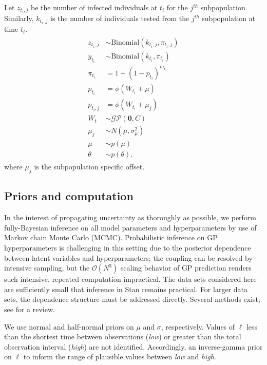 \documentclass{article}
\begin{document}
Let $z_{t_i,j}$ be the number of infected individuals at $t_i$ for the $j^{th}$ subpopulation. Similarly, $k_{t_i, j}$ is the number of individuals tested from the $j^{th}$ subpopulation at time $t_i$. 
\begin{align}
\begin{split} \label{hier}
    z_{t_i,j} & \sim \text{Binomial}(k_{t_i,j}, \pi_{t_i,j})\\
    y_{t_i} &\sim \text{Binomial}(k_{t_i}, \pi_{t_i}) \\
    \pi_{t_i} &= 1 - (1 - p_{t_i})^{m_{t_i}} \\
    p_{t_i} &= \phi(W_{t_i} + \mu) \\
        p_{t_i,j} &= \phi(W_{t_i} + \mu_j) \\
    W_t &\sim \mathcal{GP}(\mathbf{0}, C) \\
     \mu_j &\sim N(\mu, \sigma^2_\mu) \\
     \mu &\sim p(\mu) \\
    \theta &\sim p(\theta).
\end{split}
\end{align}
where $\mu_j$ is the subpopulation specific offset.

\subsection{Priors and computation}

In the interest of propagating uncertainty as thoroughly as possible, we perform fully-Bayesian inference on all model parameters and hyperparameters by use of Markov chain Monte Carlo (MCMC). Probabilistic inference on GP hyperparameters is challenging in this setting due to the posterior dependence between latent variables and hyperparameters; the coupling can be resolved by intensive sampling, but the $\mathcal{O}(N^3)$ scaling behavior of GP prediction renders such intensive, repeated computation impractical. The data sets considered here are sufficiently small that inference in Stan \cite{carpenter2017stan} remains practical. For larger data sets, the dependence structure must be addressed directly. Several methods exist; see \cite{filippone2013comparative} for a review.

We use normal and half-normal priors on $\mu$ and $\sigma$, respectively. Values of $\ell$ less than the shortest time between observations (\emph{low}) or greater than the total observation interval (\emph{high}) are not identified. Accordingly, an inverse-gamma prior on $\ell$ to inform the range of plausible values between \emph{low} and \emph{high}. 
\end{document}
